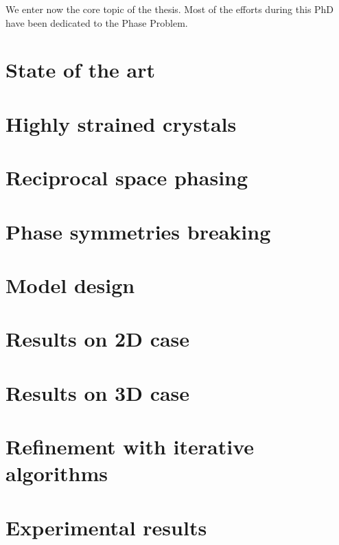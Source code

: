 We enter now the core topic of the thesis. Most of the efforts during this PhD have been dedicated to the Phase Problem.
\section{State of the art}\label{chp:phasing}
\section{Highly strained crystals}\label{chp:phasing}
\section{Reciprocal space phasing}\label{chp:phasing}
\section{Phase symmetries breaking}\label{chp:phasing}
\section{Model design}\label{chp:phasing}
\section{Results on 2D case}\label{chp:phasing}
\section{Results on 3D case}\label{chp:phasing}
\section{Refinement with iterative algorithms}\label{chp:phasing}
\section{Experimental results}\label{chp:phasing}

